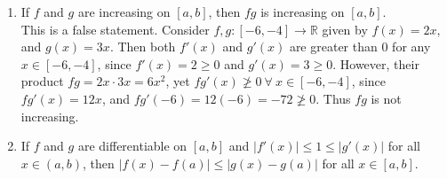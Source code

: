 \documentclass[12pt,letterpaper]{article}
\newcommand{\R}{\mathbb{R}}
\theoremstyle{case}
\theoremstyle{definition}
\begin{document}
\begin{enumerate}
\begin{enumerate}
			\item If $f$ and $g$ are increasing on $[a,b]$, then $fg$ is increasing on $[a,b]$.\\
			
			This is a false statement. Consider $f,g:[-6,-4] \to \R$ given by $f(x)=2x$, and $g(x)=3x$. Then both $f'(x)$ and $g'(x)$ are greater than 0 for any $x \in [-6,-4]$, since $f'(x)=2 \geq 0$ and $g'(x)=3 \geq 0$. However, their product $fg=2x\cdot3x=6x^2$, yet $fg'(x) \ngeq 0\ \forall\ x \in [-6,-4]$, since $fg'(x)=12x$, and $fg'(-6)=12(-6)=-72 \ngeq 0$. Thus $fg$ is not increasing.\\
			
			\item If $f$ and $g$ are differentiable on $[a,b]$ and $|f'(x)| \leq 1 \leq |g'(x)|$ for all $x \in (a,b)$, then $|f(x)-f(a)| \leq |g(x)-g(a)|$ for all $x \in [a,b]$.\\
			

\end{enumerate}
\end{enumerate}
\end{document}
